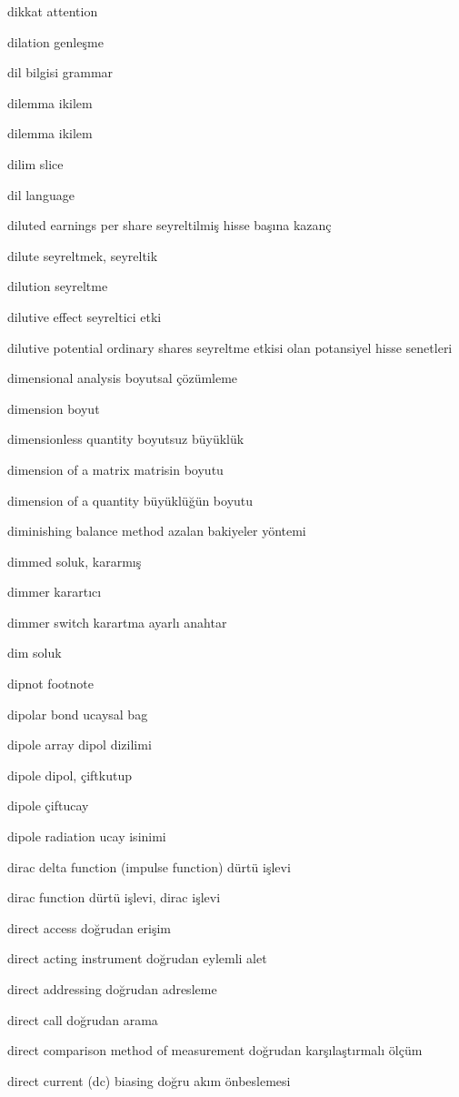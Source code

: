 \documentclass[12pt,fleqn]{article}\usepackage{../../common}
\begin{document}
dikkat attention

dilation genleşme

dil bilgisi grammar

dilemma ikilem

dilemma ikilem

dilim slice

dil language

diluted earnings per share seyreltilmiş hisse başına kazanç

dilute seyreltmek, seyreltik

dilution seyreltme

dilutive effect seyreltici etki

dilutive potential ordinary shares seyreltme etkisi olan potansiyel hisse senetleri

dimensional analysis boyutsal çözümleme

dimension boyut

dimensionless quantity boyutsuz büyüklük

dimension of a matrix matrisin boyutu

dimension of a quantity büyüklüğün boyutu

diminishing balance method azalan bakiyeler yöntemi

dimmed soluk, kararmış

dimmer karartıcı

dimmer switch karartma ayarlı anahtar

dim soluk

dipnot footnote

dipolar bond ucaysal bag

dipole array dipol dizilimi

dipole dipol, çiftkutup

dipole çiftucay

dipole radiation ucay isinimi

dirac delta function (impulse function) dürtü işlevi

dirac function dürtü işlevi, dirac işlevi

direct access doğrudan erişim

direct acting instrument doğrudan eylemli alet

direct addressing doğrudan adresleme

direct call doğrudan arama

direct comparison method of measurement doğrudan karşılaştırmalı ölçüm

direct current (dc) biasing doğru akım önbeslemesi
\end{document}
